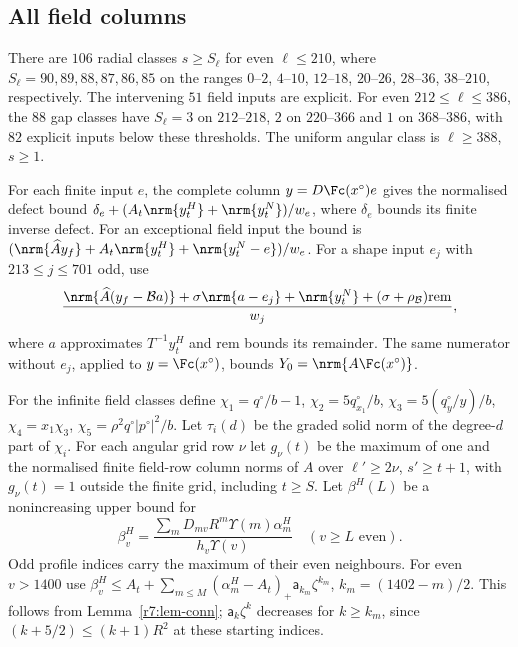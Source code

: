 \subsection{All field columns}\label{r7:sec-field}
There are $106$ radial classes $s\geq S_\ell$ for even $\ell\leq210$, where $S_\ell=90,89,88,87,86,85$ on the ranges $0$--$2$, $4$--$10$, $12$--$18$, $20$--$26$, $28$--$36$, $38$--$210$, respectively. The intervening $51$ field inputs are explicit. For even $212\leq\ell\leq386$, the $88$ gap classes have $S_\ell=3$ on $212$--$218$, $2$ on $220$--$366$ and $1$ on $368$--$386$, with $82$ explicit inputs below these thresholds. The uniform angular class is $\ell\geq388$, $s\geq1$.

For each finite input $e$, the complete column $y=D\Fc(x^\circ)e$ gives the normalised defect bound $\delta_e+(A_t\nrm{y_t^H}+\nrm{y_t^N})/w_e$, where $\delta_e$ bounds its finite inverse defect. For an exceptional field input the bound is $(\nrm{\widehat Ay_f}+A_t\nrm{y_t^H}+\nrm{y_t^N-e})/w_e$. For a shape input $e_j$ with $213\leq j\leq701$ odd, use
\[
\frac{\nrm{\widehat A(y_f-\mathcal Ba)}+\sigma\nrm{a-e_j}+\nrm{y_t^N}+(\sigma+\rho_{\mathcal B})\mathrm{rem}}{w_j},
\]
where $a$ approximates $T^{-1}y_t^H$ and $\mathrm{rem}$ bounds its remainder. The same numerator without $e_j$, applied to $y=\Fc(x^\circ)$, bounds $Y_0=\nrm{A\Fc(x^\circ)}$.

For the infinite field classes define $\chi_1=q^\circ/b-1$, $\chi_2=5q^\circ_{x_1}/b$, $\chi_3=5(q^\circ_y/y)/b$, $\chi_4=x_1\chi_3$, $\chi_5=\rho^2q^\circ|p^\circ|^2/b$. Let $\tau_i(d)$ be the graded solid norm of the degree-$d$ part of $\chi_i$. For each angular grid row $\nu$ let $g_\nu(t)$ be the maximum of one and the normalised finite field-row column norms of $A$ over $\ell'\geq2\nu$, $s'\geq t+1$, with $g_\nu(t)=1$ outside the finite grid, including $t\geq S$. Let $\beta^H(L)$ be a nonincreasing upper bound for
\[
\beta^H_v=\frac{\sum_mD_{mv}R^m\Upsilon(m)\alpha^H_m}{h_v\Upsilon(v)}\quad(v\geq L\text{ even}).
\]
Odd profile indices carry the maximum of their even neighbours. For even $v>1400$ use $\beta^H_v\leq A_t+\sum_{m\leq M}(\alpha^H_m-A_t)_+\mathsf a_{k_m}\zeta^{k_m}$, $k_m=(1402-m)/2$. This follows from Lemma~\ref{r7:lem-conn}; $\mathsf a_k\zeta^k$ decreases for $k\geq k_m$, since $(k+5/2)\leq(k+1)R^2$ at these starting indices.

